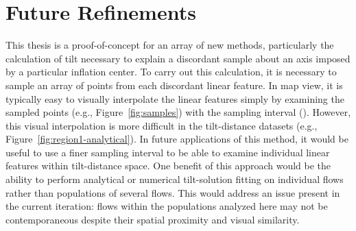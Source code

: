 

\section{Future Refinements}

This thesis is a proof-of-concept for an array of new methods, particularly the calculation of tilt necessary to explain a discordant sample about an axis imposed by a particular inflation center. To carry out this calculation, it is necessary to sample an array of points from each discordant linear feature. In map view, it is typically easy to visually interpolate the linear features simply by examining the sampled points (e.g., Figure~\ref{fig:samples}) with the sampling interval (\samplinginterval). However, this visual interpolation is more difficult in the tilt-distance datasets (e.g., Figure~\ref{fig:region1-analytical}). In future applications of this method, it would be useful to use a finer sampling interval to be able to examine individual linear features within tilt-distance space. One benefit of this approach would be the ability to perform analytical or numerical tilt-solution fitting on individual flows rather than populations of several flows. This would address an issue present in the current iteration: flows within the populations analyzed here may not be contemporaneous despite their spatial proximity and visual similarity.


